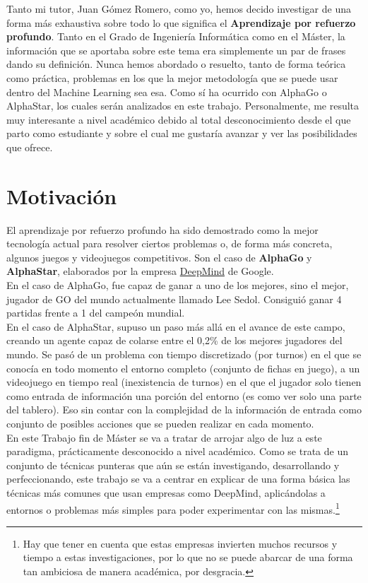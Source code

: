 \documentclass[11pt,fleqn]{book} %
\begin{document}
Tanto mi tutor, Juan Gómez Romero, como yo, hemos decido investigar de una forma más exhaustiva sobre todo lo que significa el \textbf{Aprendizaje por refuerzo profundo}. Tanto en el Grado de Ingeniería Informática como en el Máster, la información que se aportaba sobre este tema era simplemente un par de frases dando su definición. Nunca hemos abordado o resuelto, tanto de forma teórica como práctica, problemas en los que la mejor metodología que se puede usar dentro del Machine Learning sea esa. Como sí ha ocurrido con AlphaGo o AlphaStar, los cuales serán analizados en este trabajo. Personalmente, me resulta muy interesante a nivel académico debido al total desconocimiento desde el que parto como estudiante y sobre el cual me gustaría avanzar y ver las posibilidades que ofrece.

\section{Motivación}\label{sec:DRL2}

El aprendizaje por refuerzo profundo ha sido demostrado como la mejor tecnología actual para resolver ciertos problemas o, de forma más concreta, algunos juegos y videojuegos competitivos. Son el caso de \textbf{AlphaGo} y \textbf{AlphaStar}, elaborados por la empresa \href{https://deepmind.com/}{DeepMind} de Google.\cite{article:DeepMind} \\

En el caso de AlphaGo, fue capaz de ganar a uno de los mejores, sino el mejor, jugador de GO del mundo actualmente llamado Lee Sedol. Consiguió ganar 4 partidas frente a 1 del campeón mundial.\cite{article:leesedol} \cite{article:leesedol2} \\

En el caso de AlphaStar, supuso un paso más allá en el avance de este campo, creando un agente capaz de colarse entre el 0,2\% de los mejores jugadores del mundo. Se pasó de un problema con tiempo discretizado (por turnos) en el que se conocía en todo momento el entorno completo (conjunto de fichas en juego), a un videojuego en tiempo real (inexistencia de turnos) en el que el jugador solo tienen como entrada de información una porción del entorno (es como ver solo una parte del tablero). Eso sin contar con la complejidad de la información de entrada como conjunto de posibles acciones que se pueden realizar en cada momento.\cite{article:vinyals} \cite{article:vinyals2} \\

En este Trabajo fin de Máster se va a tratar de arrojar algo de luz a este paradigma, prácticamente desconocido a nivel académico. Como se trata de un conjunto de técnicas punteras que aún se están investigando, desarrollando y perfeccionando, este trabajo se va a centrar en explicar de una forma básica las técnicas más comunes que usan empresas como DeepMind, aplicándolas a entornos o problemas más simples para poder experimentar con las mismas.\footnote{Hay que tener en cuenta que estas empresas invierten muchos recursos y tiempo a estas investigaciones, por lo que no se puede abarcar de una forma tan ambiciosa de manera académica, por desgracia.} \\
\end{document}
